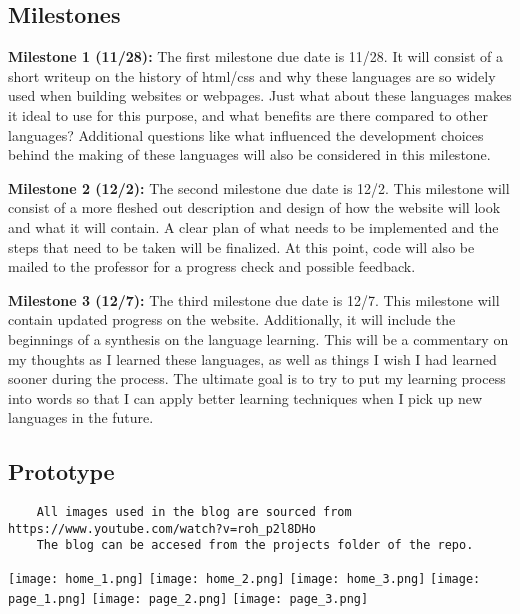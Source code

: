 \documentclass{article}
\theoremstyle{theorem}
\theoremstyle{definition}
\theoremstyle{remark}
\begin{document}
\subsection{Milestones}
\textbf{Milestone 1 (11/28):} 
\newline\indent
The first milestone due date is 11/28. It will consist of a short writeup on the history of html/css and why these languages are so widely used when building websites or webpages. Just what about these languages makes it ideal to use for this purpose, and what benefits are there compared to other languages? Additional questions like what influenced the development choices behind the making of these languages will also be considered in this milestone.\newline

\noindent\textbf{Milestone 2 (12/2):}
\newline\indent
The second milestone due date is 12/2. This milestone will consist of a more fleshed out description and design of how the website will look and what it will contain. A clear plan of what needs to be implemented and the steps that need to be taken will be finalized. At this point, code will also be mailed to the professor for a progress check and possible feedback.\newline

\noindent\textbf{Milestone 3 (12/7):}
\newline\indent
The third milestone due date is 12/7. This milestone will contain updated progress on the website. Additionally, it will include the beginnings of a synthesis on the language learning. This will be a commentary on my thoughts as I learned these languages, as well as things I wish I had learned sooner during the process. The ultimate goal is to try to put my learning process into words so that I can apply better learning techniques when I pick up new languages in the future.

\subsection{Prototype}
\cite{I}
\begin{lstlisting}
    All images used in the blog are sourced from https://www.youtube.com/watch?v=roh_p2l8DHo
    The blog can be accesed from the projects folder of the repo. 
\end{lstlisting}
\texttt{[image: home\_1.png]}
\texttt{[image: home\_2.png]}
\texttt{[image: home\_3.png]}
\texttt{[image: page\_1.png]}
\texttt{[image: page\_2.png]}
\texttt{[image: page\_3.png]}
\end{document}
